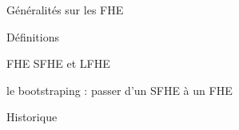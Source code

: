 \begin{section}{Généralités sur les FHE}
	\begin{subsection}{Définitions}
		\begin{subsubsection}{FHE SFHE et LFHE}
		\end{subsubsection}
		\begin{subsubsection}{le bootstraping : passer d'un SFHE à un FHE}
		\end{subsubsection}
	\end{subsection}
	\begin{subsection}{Historique}
	\end{subsection}
\end{section}
